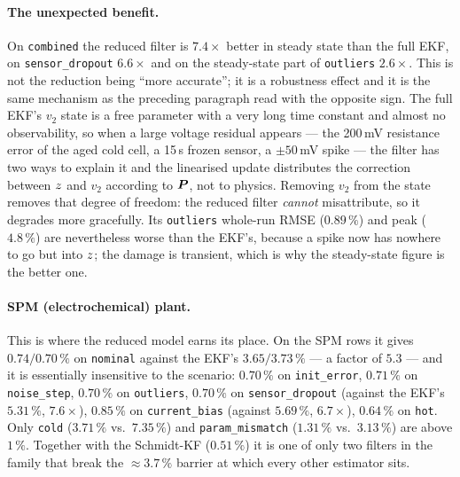 \paragraph{The unexpected benefit.}  On \texttt{combined} the reduced filter is $7.4\times$ better
in steady state than the full EKF, on \texttt{sensor\_dropout} $6.6\times$ and on the steady-state
part of \texttt{outliers} $2.6\times$.  This is not the reduction being ``more accurate''; it is a
robustness effect and it is the same mechanism as the preceding paragraph read with the opposite
sign.  The full EKF's $v_2$ state is a free parameter with a very long time constant and almost no
observability, so when a large voltage residual appears --- the 200\,mV resistance error of the
aged cold cell, a 15\,s frozen sensor, a $\pm50$\,mV spike --- the filter has two ways to explain it
and the linearised update distributes the correction between $z$ and $v_2$ according to $\bm{P}$,
not to physics.  Removing $v_2$ from the state removes that degree of freedom: the reduced filter
\emph{cannot} misattribute, so it degrades more gracefully.  Its \texttt{outliers} whole-run RMSE
($0.89\,\%$) and peak ($4.8\,\%$) are nevertheless worse than the EKF's, because a spike now has
nowhere to go but into $z$; the damage is transient, which is why the steady-state figure is the
better one.

\paragraph{SPM (electrochemical) plant.}  This is where the reduced model earns its place.  On the
SPM rows it gives $0.74/0.70\,\%$ on \texttt{nominal} against the EKF's $3.65/3.73\,\%$ --- a factor
of $5.3$ --- and it is essentially insensitive to the scenario: $0.70\,\%$ on \texttt{init\_error},
$0.71\,\%$ on \texttt{noise\_step}, $0.70\,\%$ on \texttt{outliers}, $0.70\,\%$ on
\texttt{sensor\_dropout} (against the EKF's $5.31\,\%$, $7.6\times$), $0.85\,\%$ on
\texttt{current\_bias} (against $5.69\,\%$, $6.7\times$), $0.64\,\%$ on \texttt{hot}.  Only
\texttt{cold} ($3.71\,\%$ vs.\ $7.35\,\%$) and \texttt{param\_mismatch} ($1.31\,\%$ vs.\
$3.13\,\%$) are above $1\,\%$.  Together with the Schmidt-KF ($0.51\,\%$) it is one of only two
filters in the family that break the $\approx3.7\,\%$ barrier at which every other estimator sits.

